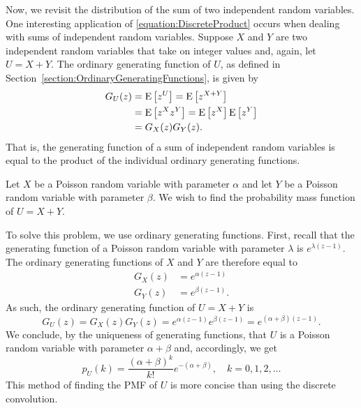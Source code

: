 Now, we revisit the distribution of the sum of two independent random variables.
One interesting application of \eqref{equation:DiscreteProduct} occurs when dealing with sums of independent random variables.
Suppose $X$ and $Y$ are two independent random variables that take on integer values and, again, let $U = X + Y$.
The ordinary generating function of $U$, as defined in Section~\ref{section:OrdinaryGeneratingFunctions}, is given by
\begin{equation*}
\begin{split}
G_U (z) &= \mathrm{E} \left[ z^U \right]
= \mathrm{E} \left[ z^{X + Y} \right] \\
&= \mathrm{E} \left[ z^X z^Y \right]
= \mathrm{E} \left[ z^X \right] \mathrm{E} \left[ z^Y \right] \\
&= G_X(z) G_Y(z) .
\end{split}
\end{equation*}
That is, the generating function of a sum of independent random variables is equal to the product of the individual ordinary generating functions.

\begin{example}
Let $X$ be a Poisson random variable with parameter $\alpha$ and let $Y$ be a Poisson random variable with parameter $\beta$.
We wish to find the probability mass function of $U = X + Y$.

To solve this problem, we use ordinary generating functions.
First, recall that the generating function of a Poisson random variable with parameter $\lambda$ is $e^{\lambda (z-1)}$.
The ordinary generating functions of $X$ and $Y$ are therefore equal to
\begin{align*}
G_X (z) &= e^{\alpha (z-1)} \\
G_Y (z) &= e^{\beta (z-1)} .
\end{align*}
As such, the ordinary generating function of $U = X + Y$ is
\begin{equation*}
G_U (z) = G_X (z) G_Y(z) = e^{\alpha (z-1)} e^{\beta (z-1)}
= e^{(\alpha + \beta) (z-1)} .
\end{equation*}
We conclude, by the uniqueness of generating functions, that $U$ is a Poisson random variable with parameter $\alpha + \beta$ and, accordingly, we get
\begin{equation*}
p_U (k) = \frac{ (\alpha + \beta)^k }{k!} e^{- (\alpha + \beta) },
\quad k = 0, 1, 2, \ldots
\end{equation*}
This method of finding the PMF of $U$ is more concise than using the discrete convolution.
\end{example}


